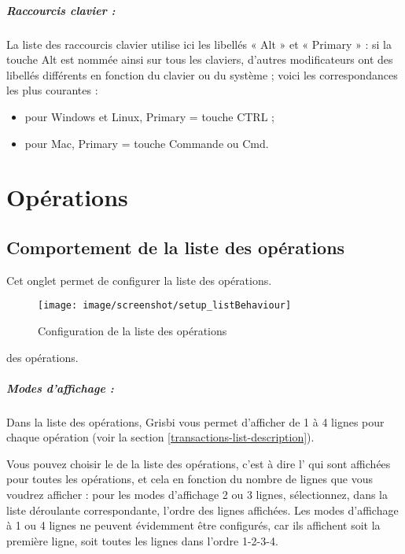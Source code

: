 \subparagraph{Raccourcis clavier :}

La liste des raccourcis clavier utilise ici les libellés « Alt » et « Primary » : si la touche Alt est nommée ainsi sur tous les claviers, d'autres modificateurs ont des libellés différents en fonction du clavier ou du système ; voici les correspondances les plus courantes :

\begin{itemize}
	\item pour Windows et Linux, Primary = touche CTRL ;
	\item pour Mac, Primary = touche Commande ou Cmd.
\end{itemize}



\section{Opérations\label{setup-operations}}


\subsection{Comportement de la liste des opérations\label{setup-operations-list}}

Cet onglet permet de configurer la liste \ifIllustration des opérations.
\begin{figure}[ht]
\begin{center}
\texttt{[image: image/screenshot/setup\_listBehaviour]}
\end{center}
\caption{Configuration de la liste des opérations}
\label{setup-listBehaviour-img}
\end{figure}
\else des opérations.
\fi


\subparagraph{Modes d'affichage :\label{setup-operations-list-modes}}

Dans la liste des opérations, Grisbi vous permet d'afficher de 1 à 4 lignes pour chaque opération (voir la section \vref{transactions-list-description}). 

Vous pouvez choisir le  de la liste des opérations, c'est à dire l' qui sont affichées pour toutes les opérations, et cela en fonction du nombre de lignes que vous voudrez afficher : pour les modes d'affichage 2 ou 3 lignes, sélectionnez, dans la liste déroulante  correspondante, l'ordre des lignes affichées. Les modes d'affichage à 1 ou 4 lignes ne peuvent  évidemment être configurés, car ils affichent soit la première ligne, soit toutes les lignes dans l'ordre 1-2-3-4.

